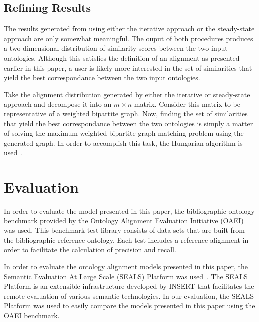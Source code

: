 \documentclass[letterpaper,twocolumn,12pt]{article}
\begin{document}
\subsection{Refining Results}

The results generated from using either the iterative approach or the steady-state approach are only somewhat meaningful.
The ouput of both procedures produces a two-dimensional distribution of similarity scores between the two input ontologies.
Although this satisfies the definition of an alignment as presented earlier in this paper, a user is likely more interested in the set of similarities that yield the best correspondance between the two input ontologies.

Take the alignment distribution generated by either the iterative or steady-state approach and decompose it into an $m \times n$ matrix.
Consider this matrix to be representative of a weighted bipartite graph.
Now, finding the set of similarities that yield the best correspondance between the two ontologies is simply a matter of solving the maximum-weighted bipartite graph matching problem using the generated graph.
In order to accomplish this task, the Hungarian algorithm is used~\cite{kuhn:1955:hungarian}.


%

\section{Evaluation}
\label{sec:eval}

In order to evaluate the model presented in this paper, the bibliographic ontology benchmark provided by the Ontology Alignment Evaluation Initiative (OAEI) was used.
This benchmark test library consists of data sets that are built from the bibliographic reference ontology.
Each test includes a reference alignment in order to facilitate the calculation of precision and recall.

In order to evaluate the ontology alignment models presented in this paper, the Semantic Evaluation At Large Scale (SEALS) Platform was used~\cite{esteban:2010:executing, wrigley:2010:evaluating}.
The SEALS Platform is an extensible infrastructure developed by INSERT that facilitates the remote evaluation of various semantic technologies.
In our evaluation, the SEALS Platform was used to easily compare the models presented in this paper using the OAEI benchmark.
\end{document}
